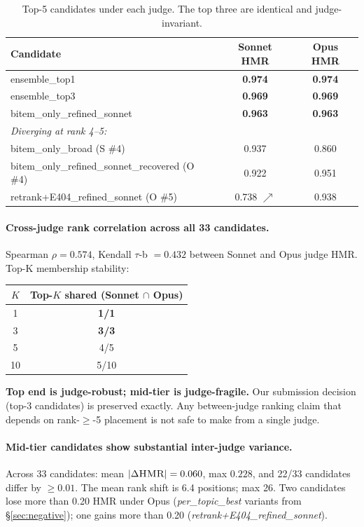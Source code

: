 \documentclass[11pt,a4paper]{article}
\newcommand{\HMR}{\textsc{HMR}}
\begin{document}
\begin{table}[t]
\centering
\caption{Top-5 candidates under each judge. The top three are
identical and judge-invariant.}
\label{tab:top_per_judge}
\begin{tabular}{lcc}
\toprule
Candidate & Sonnet HMR & Opus HMR \\
\midrule
ensemble\_top1                          & \textbf{0.974} & \textbf{0.974} \\
ensemble\_top3                          & \textbf{0.969} & \textbf{0.969} \\
bitem\_only\_refined\_sonnet            & \textbf{0.963} & \textbf{0.963} \\
\midrule
\multicolumn{3}{l}{\emph{Diverging at rank 4--5:}} \\
bitem\_only\_broad             (S \#4)  & 0.937          & 0.860 \\
bitem\_only\_refined\_sonnet\_recovered (O \#4) & 0.922  & 0.951 \\
retrank+E404\_refined\_sonnet  (O \#5)  & 0.738 $\nearrow$ & 0.938 \\
\bottomrule
\end{tabular}
\end{table}

\paragraph{Cross-judge rank correlation across all 33 candidates.}
Spearman $\rho = 0.574$, Kendall $\tau$-b $= 0.432$ between Sonnet
and Opus judge HMR. Top-K membership stability:

\begin{center}
\small
\begin{tabular}{cc}
\toprule
$K$ & Top-$K$ shared (Sonnet $\cap$ Opus) \\
\midrule
1 & \textbf{1/1} \\
3 & \textbf{3/3} \\
5 & 4/5 \\
10 & 5/10 \\
\bottomrule
\end{tabular}
\end{center}

\noindent \textbf{Top end is judge-robust; mid-tier is judge-fragile.}
Our submission decision (top-3 candidates) is preserved exactly. Any
between-judge ranking claim that depends on rank-$\geq$-5 placement is
not safe to make from a single judge.

\paragraph{Mid-tier candidates show substantial inter-judge variance.}
Across 33 candidates: mean $|\Delta \HMR| = 0.060$, max $0.228$, and
22/33 candidates differ by $\geq 0.01$. The mean rank shift is 6.4
positions; max 26. Two candidates lose more than 0.20 \HMR{} under
Opus (\textit{per\_topic\_best} variants from \S\ref{sec:negative});
one gains more than 0.20 (\textit{retrank+E404\_refined\_sonnet}).
\end{document}
